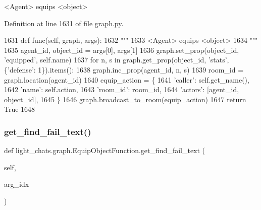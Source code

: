\begin{DoxyVerb}<Agent> equips <object>
\end{DoxyVerb}
 

Definition at line 1631 of file graph.\+py.


\begin{DoxyCode}
1631     \textcolor{keyword}{def }func(self, graph, args):
1632         \textcolor{stringliteral}{"""}
1633 \textcolor{stringliteral}{        <Agent> equips <object>}
1634 \textcolor{stringliteral}{        """}
1635         agent\_id, object\_id = args[0], args[1]
1636         graph.set\_prop(object\_id, \textcolor{stringliteral}{'equipped'}, self.name)
1637         \textcolor{keywordflow}{for} n, s \textcolor{keywordflow}{in} graph.get\_prop(object\_id, \textcolor{stringliteral}{'stats'}, \{\textcolor{stringliteral}{'defense'}: 1\}).items():
1638             graph.inc\_prop(agent\_id, n, s)
1639         room\_id = graph.location(agent\_id)
1640         equip\_action = \{
1641             \textcolor{stringliteral}{'caller'}: self.get\_name(),
1642             \textcolor{stringliteral}{'name'}: self.action,
1643             \textcolor{stringliteral}{'room\_id'}: room\_id,
1644             \textcolor{stringliteral}{'actors'}: [agent\_id, object\_id],
1645         \}
1646         graph.broadcast\_to\_room(equip\_action)
1647         \textcolor{keywordflow}{return} \textcolor{keyword}{True}
1648 
\end{DoxyCode}
\mbox{\label{classlight__chats_1_1graph_1_1EquipObjectFunction_a63956c69d130eb078d3c987b8b220190}} 
\subsubsection{\texorpdfstring{get\+\_\+find\+\_\+fail\+\_\+text()}{get\_find\_fail\_text()}}
{\footnotesize\ttfamily def light\+\_\+chats.\+graph.\+Equip\+Object\+Function.\+get\+\_\+find\+\_\+fail\+\_\+text (\begin{DoxyParamCaption}\item[{}]{self,  }\item[{}]{arg\+\_\+idx }\end{DoxyParamCaption})}




